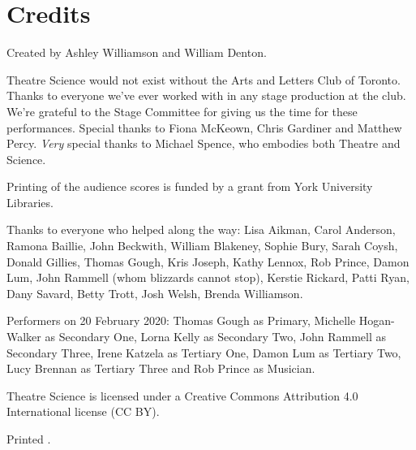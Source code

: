 
\newpageforperformers{}

\section{Credits}

Created by Ashley Williamson and William Denton.

Theatre Science would not exist without the Arts and Letters Club of Toronto.  Thanks to everyone we've ever worked with in any stage production at the club.  We're grateful to the Stage Committee for giving us the time for these performances. Special thanks to Fiona McKeown, Chris Gardiner and Matthew Percy.  \textit{Very} special thanks to Michael Spence, who embodies both Theatre and Science.

Printing of the audience scores is funded by a grant from York University Libraries.

Thanks to everyone who helped along the way:  Lisa Aikman, Carol Anderson, Ramona Baillie, John Beckwith, William Blakeney, Sophie Bury, Sarah Coysh, Donald Gillies, Thomas Gough, Kris Joseph, Kathy Lennox, Rob Prince, Damon Lum, John Rammell (whom blizzards cannot stop), Kerstie Rickard, Patti Ryan, Dany Savard, Betty Trott, Josh Welsh, Brenda Williamson.

Performers on 20 February 2020: Thomas Gough as Primary, Michelle Hogan-Walker as Secondary One, Lorna Kelly as Secondary Two, John Rammell as Secondary Three, Irene Katzela as Tertiary One, Damon Lum as Tertiary Two, Lucy Brennan as Tertiary Three and Rob Prince as Musician.

Theatre Science is licensed under a Creative Commons Attribution 4.0 International license (CC BY).  %

\vfill

{\small Printed \DTMnow.}
